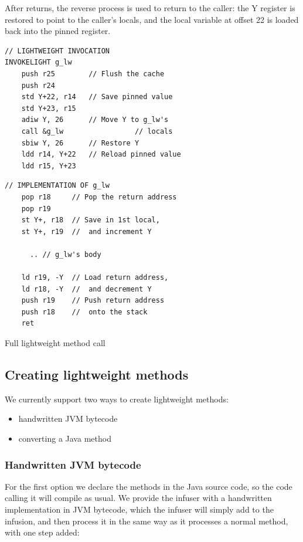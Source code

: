 After  returns, the reverse process is used to return to the caller: the Y register is restored to point to the caller's locals, and the local variable at offset 22 is loaded back into the pinned register.

\begin{listing}
\centering
\begin{minipage}[t]{0.48\textwidth}
\begin{verbatim}
// LIGHTWEIGHT INVOCATION
INVOKELIGHT g_lw
    push r25        // Flush the cache
    push r24
    std Y+22, r14   // Save pinned value
    std Y+23, r15
    adiw Y, 26      // Move Y to g_lw's
    call &g_lw                 // locals
    sbiw Y, 26      // Restore Y
    ldd r14, Y+22   // Reload pinned value
    ldd r15, Y+23
\end{verbatim}
\end{minipage}\hfill
\begin{minipage}[t]{0.48\textwidth}
\centering
\begin{verbatim}
// IMPLEMENTATION OF g_lw
    pop r18     // Pop the return address
    pop r19
    st Y+, r18  // Save in 1st local,
    st Y+, r19  //  and increment Y

      .. // g_lw's body

    ld r19, -Y  // Load return address,
    ld r18, -Y  //  and decrement Y
    push r19    // Push return address
    push r18    //  onto the stack
    ret
\end{verbatim}
\end{minipage}
\caption{Full lightweight method call}
\label{lst-full-lighweight-method-call}
\end{listing}


\subsection{Creating lightweight methods}
We currently support two ways to create lightweight methods:
\begin{itemize}
	\item handwritten JVM bytecode
	\item converting a Java method 
\end{itemize}

\subsubsection{Handwritten JVM bytecode}
For the first option we declare the methods  in the Java source code, so the code calling it will compile as usual. We provide the infuser with a handwritten implementation in JVM bytecode, which the infuser will simply add to the infusion, and then process it in the same way as it processes a normal method, with one step added:

